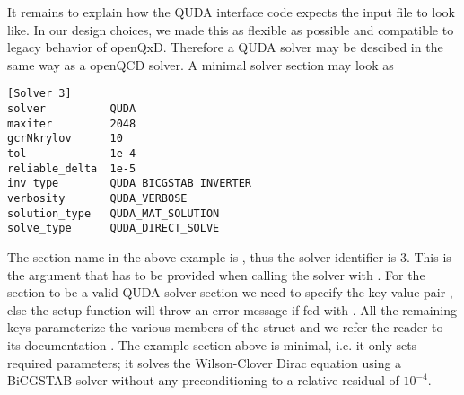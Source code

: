 It remains to explain how the QUDA interface code expects the input file to look like. In our design choices, we made this as flexible as possible and compatible to legacy behavior of openQxD. Therefore a QUDA solver may be descibed in the same way as a openQCD solver. A minimal solver section may look as
\begin{verbatim}
[Solver 3]
solver          QUDA
maxiter         2048
gcrNkrylov      10
tol             1e-4
reliable_delta  1e-5
inv_type        QUDA_BICGSTAB_INVERTER
verbosity       QUDA_VERBOSE
solution_type   QUDA_MAT_SOLUTION
solve_type      QUDA_DIRECT_SOLVE
\end{verbatim}
The section name in the above example is , thus the solver identifier is 3.
This is the argument  that has to be provided when
calling the solver with .
For the section to be a valid QUDA solver section we need to specify the key-value pair ,
else the setup function will throw an error message if
fed with . All the remaining keys parameterize the
various members of the  struct and we refer
the reader to its documentation \cite{QUDApaper,gitlab:quda}. The example section above is minimal, i.e. it only sets required parameters; it solves the Wilson-Clover Dirac equation using a BiCGSTAB solver without any preconditioning to a relative residual of $10^{-4}$.





